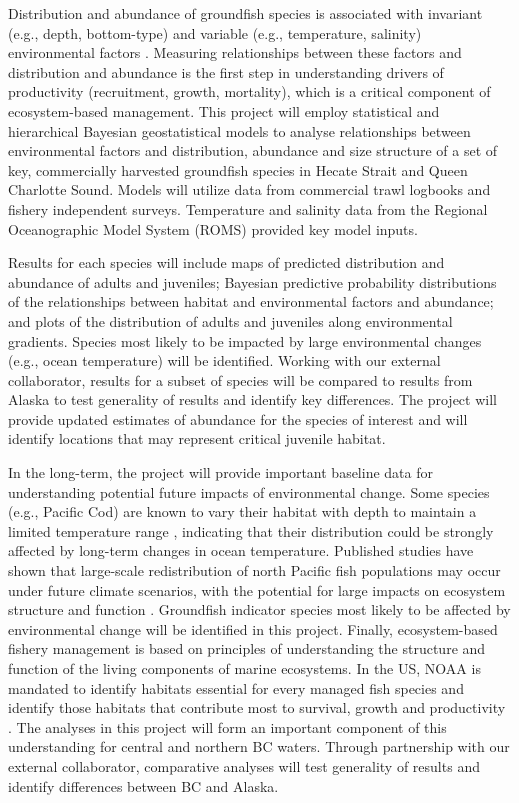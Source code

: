 \documentclass[11pt]{book}\usepackage[]{graphicx}\usepackage[]{color}
\begin{document}
Distribution and abundance of groundfish species is associated with invariant (e.g., depth, bottom-type) and variable (e.g., temperature, salinity) environmental factors \citep{psf94, roop05, roop08}.  Measuring relationships between these factors and distribution and abundance is the first step in understanding drivers of productivity (recruitment, growth, mortality), which is a critical component of ecosystem-based management. This project will employ statistical and hierarchical Bayesian geostatistical models \citep{roop05, roop08, lec13, lec13b} to analyse relationships between environmental factors and distribution, abundance and size structure of a set of key, commercially harvested groundfish species in Hecate Strait and Queen Charlotte Sound. Models will utilize data from commercial trawl logbooks and fishery independent surveys. Temperature and salinity data from the Regional Oceanographic Model System (ROMS) \citep{mf12} provided key model inputs.

Results for each species will include maps of predicted distribution and abundance of adults and juveniles; Bayesian predictive probability distributions of the relationships between habitat and environmental factors and abundance; and plots of the distribution of adults and juveniles along environmental gradients. Species most likely to be impacted by large environmental changes (e.g., ocean temperature) will be identified. Working with our external collaborator, results for a subset of species will be compared to results from Alaska to test generality of results and identify key differences. The project will provide updated estimates of abundance for the species of interest and will identify locations that may represent critical juvenile habitat. 

In the long-term, the project will provide important baseline data for understanding potential future impacts of environmental change. Some species (e.g., Pacific Cod) are known to vary their habitat with depth to maintain a limited temperature range \citep{psf94}, indicating that their distribution could be strongly affected by long-term changes in ocean temperature. Published studies have shown that large-scale redistribution of north Pacific fish populations may occur under future climate scenarios, with the potential for large impacts on ecosystem structure and function \citep{jc14, cheung15}. Groundfish indicator species most likely to be affected by environmental change will be identified in this project.  Finally, ecosystem-based fishery management is based on principles of understanding the structure and function of the living components of marine ecosystems. In the US, NOAA is mandated to identify habitats essential for every managed fish species and identify those habitats that contribute most to survival, growth and productivity \citep{sig12}. The analyses in this project will form an important component of this understanding for central and northern BC waters. Through partnership with our external collaborator, comparative analyses will test generality of results and identify differences between BC and Alaska.
\end{document}
